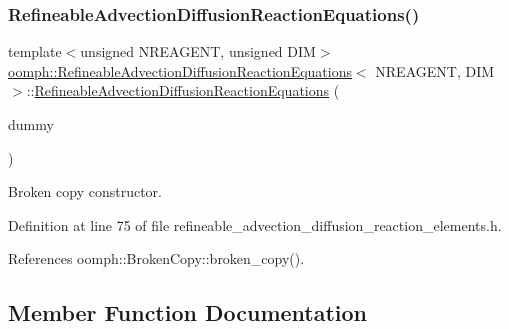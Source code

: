 \subsubsection{\texorpdfstring{Refineable\+Advection\+Diffusion\+Reaction\+Equations()}{RefineableAdvectionDiffusionReactionEquations()}\hspace{0.1cm}{\footnotesize\ttfamily [2/2]}}
{\footnotesize\ttfamily template$<$unsigned N\+R\+E\+A\+G\+E\+NT, unsigned D\+IM$>$ \\
\hyperlink{classoomph_1_1RefineableAdvectionDiffusionReactionEquations}{oomph\+::\+Refineable\+Advection\+Diffusion\+Reaction\+Equations}$<$ N\+R\+E\+A\+G\+E\+NT, D\+IM $>$\+::\hyperlink{classoomph_1_1RefineableAdvectionDiffusionReactionEquations}{Refineable\+Advection\+Diffusion\+Reaction\+Equations} (\begin{DoxyParamCaption}\item[{const \hyperlink{classoomph_1_1RefineableAdvectionDiffusionReactionEquations}{Refineable\+Advection\+Diffusion\+Reaction\+Equations}$<$ N\+R\+E\+A\+G\+E\+NT, D\+IM $>$ \&}]{dummy }\end{DoxyParamCaption})\hspace{0.3cm}{\ttfamily [inline]}}



Broken copy constructor. 



Definition at line 75 of file refineable\+\_\+advection\+\_\+diffusion\+\_\+reaction\+\_\+elements.\+h.



References oomph\+::\+Broken\+Copy\+::broken\+\_\+copy().



\subsection{Member Function Documentation}
\mbox{\label{classoomph_1_1RefineableAdvectionDiffusionReactionEquations_ac00be5fb705024129d006f2ed2d80eab}} 
